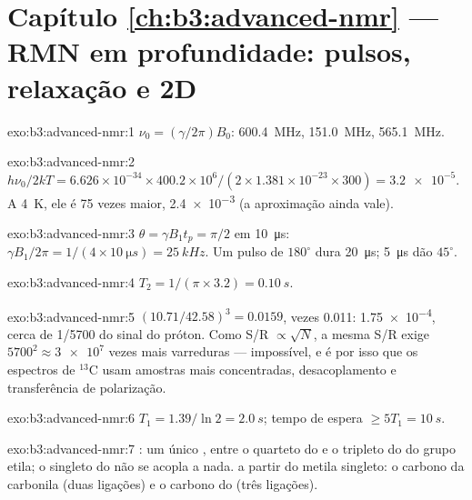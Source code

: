 \section*{Capítulo \ref{ch:b3:advanced-nmr} --- RMN em profundidade: pulsos, relaxação e 2D}

\begin{solution}{exo:b3:advanced-nmr:1}
$\nu_0 = (\gamma/2\pi)B_0$:  \qty{600.4}{MHz},  \qty{151.0}{MHz}, 
\qty{565.1}{MHz}.
\end{solution}

\begin{solution}{exo:b3:advanced-nmr:2}
$h\nu_0/2kT = 6.626\times10^{-34} \times 400.2\times10^6/(2 \times 1.381\times10^{-23} \times 300)
= \num{3.2e-5}$. A \qty{4}{K}, ele é 75 vezes maior, \num{2.4e-3} (a aproximação
ainda vale).
\end{solution}

\begin{solution}{exo:b3:advanced-nmr:3}
$\theta = \gamma B_1t_p = \pi/2$ em \qty{10}{\micro s}: $\gamma B_1/2\pi = 1/(4 \times
\qty{10}{\micro s}) = \qty{25}{kHz}$. Um pulso de $180^\circ$ dura \qty{20}{\micro s}; \qty{5}{\micro s}
dão $45^\circ$.
\end{solution}

\begin{solution}{exo:b3:advanced-nmr:4}
$T_2 = 1/(\pi \times 3.2) = \qty{0.10}{s}$.
\end{solution}

\begin{solution}{exo:b3:advanced-nmr:5}
$(10.71/42.58)^3 = 0.0159$, vezes 0.011: \num{1.75e-4}, cerca de 1/5700 do sinal
do próton. Como S/R $\propto\sqrt N$, a mesma S/R exige $5700^2 \approx \num{3e7}$ vezes mais
varreduras --- impossível, e é por isso que os espectros de ${}^{13}$C usam amostras
mais concentradas, desacoplamento e transferência de polarização.
\end{solution}

\begin{solution}{exo:b3:advanced-nmr:6}
$T_1 = 1.39/\ln2 = \qty{2.0}{s}$; tempo de espera $\ge 5T_1 = \qty{10}{s}$.
\end{solution}

\begin{solution}{exo:b3:advanced-nmr:7}
: um único , entre o quarteto do  e o tripleto do  do
grupo etila; o singleto do  não se acopla a nada.  a partir do metila
singleto: o carbono da carbonila (duas ligações) e o carbono do  (três ligações).
\end{solution}

